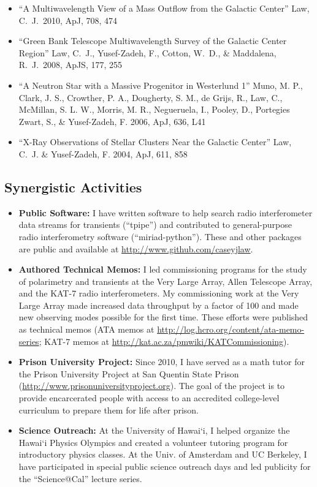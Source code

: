 \documentclass[11pt]{article}
\begin{document}
\begin{itemize}
 \item ``A Multiwavelength View of a Mass Outflow from the Galactic Center'' Law, C.~J.\ 2010, ApJ, 708, 474

 \item ``Green Bank Telescope Multiwavelength Survey of the Galactic Center Region'' Law, C.~J., Yusef-Zadeh, F., Cotton, W.~D., \& Maddalena, R.~J.\ 2008, ApJS, 177, 255

 \item ``A Neutron Star with a Massive Progenitor in Westerlund 1'' Muno, M. P., Clark, J. S., Crowther, P. A., Dougherty, S. M., de Grijs, R., Law, C., McMillan, S. L. W., Morris, M. R., Negueruela, I., Pooley, D., Portegies Zwart, S., \& Yusef-Zadeh, F. 2006, ApJ, 636, L41

 \item ``X-Ray Observations of Stellar Clusters Near the Galactic Center'' Law, C.~J. \& Yusef-Zadeh, F. 2004, ApJ, 611, 858

\end{itemize}

\subsection*{Synergistic Activities}

\begin{itemize}
 \item {\bf Public Software:} I have written software to help search radio interferometer data streams for transients (``tpipe'') and contributed to general-purpose radio interferometry software (``miriad-python''). These and other packages are public and available at \url{http://www.github.com/caseyjlaw}.

 \item {\bf Authored Technical Memos:} I led commissioning programs for the study of polarimetry and transients at the Very Large Array, Allen Telescope Array, and the KAT-7 radio interferometers. My commissioning work at the Very Large Array made increased data throughput by a factor of 100 and made new observing modes possible for the first time. These efforts were published as technical memos (ATA memos at \url{http://log.hcro.org/content/ata-memo-series}; KAT-7 memos at \url{http://kat.ac.za/pmwiki/KATCommissioning}).

 \item {\bf Prison University Project:} Since 2010, I have served as a math tutor for the Prison University Project at San Quentin State Prison (\url{http://www.prisonuniversityproject.org}). The goal of the project is to provide encarcerated people with access to an accredited college-level curriculum to prepare them for life after prison.

 \item {\bf Science Outreach:} At the University of Hawai`i, I helped organize the Hawai`i Physics Olympics and created a volunteer tutoring program for introductory physics classes. At the Univ. of Amsterdam and UC Berkeley, I have participated in special public science outreach days and led publicity for the ``Science@Cal'' lecture series.

\end{itemize}

\thispagestyle{empty}
\end{document}
